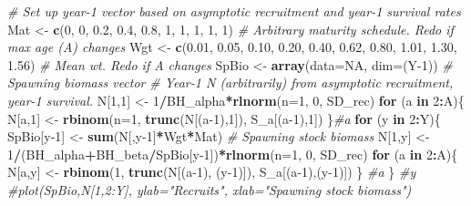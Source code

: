 \documentclass[
]{krantz}
\makeatletter
\newenvironment{Shaded}{\begin{snugshade}}{\end{snugshade}}
\newcommand{\AttributeTok}[1]{\textcolor[rgb]{0.27,0.27,0.27}{#1}}
\newcommand{\CommentTok}[1]{\textcolor[rgb]{0.37,0.37,0.37}{\textit{#1}}}
\newcommand{\ConstantTok}[1]{\textcolor[rgb]{0.37,0.37,0.37}{#1}}
\newcommand{\ControlFlowTok}[1]{\textcolor[rgb]{0.27,0.27,0.27}{\textbf{#1}}}
\newcommand{\DecValTok}[1]{\textcolor[rgb]{0.06,0.06,0.06}{#1}}
\newcommand{\FloatTok}[1]{\textcolor[rgb]{0.06,0.06,0.06}{#1}}
\newcommand{\FunctionTok}[1]{\textcolor[rgb]{0.27,0.27,0.27}{\textbf{#1}}}
\newcommand{\NormalTok}[1]{#1}
\newcommand{\OtherTok}[1]{\textcolor[rgb]{0.37,0.37,0.37}{#1}}
\newcommand{\SpecialCharTok}[1]{\textcolor[rgb]{0.43,0.43,0.43}{\textbf{#1}}}
\newenvironment{kframe}{%
\medskip{}
\setlength{\fboxsep}{.8em}
 \def\at@end@of@kframe{}%
 \ifinner\ifhmode%
  \def\at@end@of@kframe{\end{minipage}}%
  \begin{minipage}{\columnwidth}%
 \fi\fi%
 \def\FrameCommand##1{\hskip\@totalleftmargin \hskip-\fboxsep
 \colorbox{shadecolor}{##1}\hskip-\fboxsep
     \hskip-\linewidth \hskip-\@totalleftmargin \hskip\columnwidth}%
 \MakeFramed {\advance\hsize-\width
   \@totalleftmargin\z@ \linewidth\hsize
   \@setminipage}}%
 {\par\unskip\endMakeFramed%
 \at@end@of@kframe}
\renewenvironment{Shaded}{\begin{kframe}}{\end{kframe}}
\makeatother
\begin{document}
\begin{Shaded}
\begin{Highlighting}[]
\CommentTok{\# Set up year{-}1 vector based on asymptotic recruitment and year{-}1 survival rates}
\NormalTok{Mat }\OtherTok{\textless{}{-}} \FunctionTok{c}\NormalTok{(}\DecValTok{0}\NormalTok{, }\DecValTok{0}\NormalTok{, }\FloatTok{0.2}\NormalTok{, }\FloatTok{0.4}\NormalTok{, }\FloatTok{0.8}\NormalTok{, }\DecValTok{1}\NormalTok{, }\DecValTok{1}\NormalTok{, }\DecValTok{1}\NormalTok{, }\DecValTok{1}\NormalTok{, }\DecValTok{1}\NormalTok{) }\CommentTok{\# Arbitrary maturity schedule. Redo if max age (A) changes}
\NormalTok{Wgt }\OtherTok{\textless{}{-}} \FunctionTok{c}\NormalTok{(}\FloatTok{0.01}\NormalTok{, }\FloatTok{0.05}\NormalTok{, }\FloatTok{0.10}\NormalTok{, }\FloatTok{0.20}\NormalTok{, }\FloatTok{0.40}\NormalTok{, }\FloatTok{0.62}\NormalTok{, }\FloatTok{0.80}\NormalTok{, }\FloatTok{1.01}\NormalTok{, }\FloatTok{1.30}\NormalTok{, }\FloatTok{1.56}\NormalTok{) }\CommentTok{\# Mean wt. Redo if A changes}
\NormalTok{SpBio }\OtherTok{\textless{}{-}} \FunctionTok{array}\NormalTok{(}\AttributeTok{data=}\ConstantTok{NA}\NormalTok{, }\AttributeTok{dim=}\NormalTok{(Y}\DecValTok{{-}1}\NormalTok{)) }\CommentTok{\# Spawning biomass vector}
\CommentTok{\# Year{-}1 N (arbitrarily) from asymptotic recruitment, year{-}1 survival.}
\NormalTok{N[}\DecValTok{1}\NormalTok{,}\DecValTok{1}\NormalTok{] }\OtherTok{\textless{}{-}} \DecValTok{1}\SpecialCharTok{/}\NormalTok{BH\_alpha}\SpecialCharTok{*}\FunctionTok{rlnorm}\NormalTok{(}\AttributeTok{n=}\DecValTok{1}\NormalTok{, }\DecValTok{0}\NormalTok{, SD\_rec)}
\ControlFlowTok{for}\NormalTok{ (a }\ControlFlowTok{in} \DecValTok{2}\SpecialCharTok{:}\NormalTok{A)\{}
\NormalTok{  N[a,}\DecValTok{1}\NormalTok{] }\OtherTok{\textless{}{-}} \FunctionTok{rbinom}\NormalTok{(}\AttributeTok{n=}\DecValTok{1}\NormalTok{, }\FunctionTok{trunc}\NormalTok{(N[(a}\DecValTok{{-}1}\NormalTok{),}\DecValTok{1}\NormalTok{]), S\_a[(a}\DecValTok{{-}1}\NormalTok{),}\DecValTok{1}\NormalTok{])}
\NormalTok{\}}\CommentTok{\#a}
\ControlFlowTok{for}\NormalTok{ (y }\ControlFlowTok{in} \DecValTok{2}\SpecialCharTok{:}\NormalTok{Y)\{}
\NormalTok{  SpBio[y}\DecValTok{{-}1}\NormalTok{] }\OtherTok{\textless{}{-}} \FunctionTok{sum}\NormalTok{(N[,y}\DecValTok{{-}1}\NormalTok{]}\SpecialCharTok{*}\NormalTok{Wgt}\SpecialCharTok{*}\NormalTok{Mat) }\CommentTok{\# Spawning stock biomass}
\NormalTok{  N[}\DecValTok{1}\NormalTok{,y] }\OtherTok{\textless{}{-}} \DecValTok{1}\SpecialCharTok{/}\NormalTok{(BH\_alpha}\SpecialCharTok{+}\NormalTok{BH\_beta}\SpecialCharTok{/}\NormalTok{SpBio[y}\DecValTok{{-}1}\NormalTok{])}\SpecialCharTok{*}\FunctionTok{rlnorm}\NormalTok{(}\AttributeTok{n=}\DecValTok{1}\NormalTok{, }\DecValTok{0}\NormalTok{, SD\_rec)}
  \ControlFlowTok{for}\NormalTok{ (a }\ControlFlowTok{in} \DecValTok{2}\SpecialCharTok{:}\NormalTok{A)\{}
\NormalTok{    N[a,y] }\OtherTok{\textless{}{-}} \FunctionTok{rbinom}\NormalTok{(}\DecValTok{1}\NormalTok{, }\FunctionTok{trunc}\NormalTok{(N[(a}\DecValTok{{-}1}\NormalTok{), (y}\DecValTok{{-}1}\NormalTok{)]), S\_a[(a}\DecValTok{{-}1}\NormalTok{),(y}\DecValTok{{-}1}\NormalTok{)])}
\NormalTok{    \} }\CommentTok{\#a}
\NormalTok{  \} }\CommentTok{\#y}
\CommentTok{\#plot(SpBio,N[1,2:Y], ylab="Recruits", xlab="Spawning stock biomass")}


\end{Highlighting}
\end{Shaded}
\end{document}
